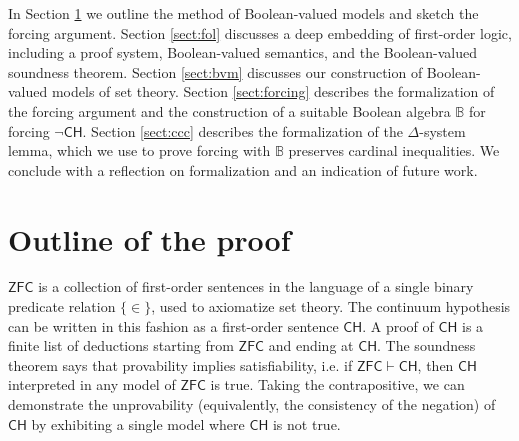 \documentclass[a4paper,USenglish,cleveref, autoref]{lipics-v2019}
\newcommand{\B}{\mathbb{B}}
\theoremstyle{definition}
\begin{document}
In Section \ref{sect:outline} we outline the method of Boolean-valued models and sketch the forcing argument. Section \ref{sect:fol} discusses a deep embedding of first-order logic, including a proof system, Boolean-valued semantics, and the Boolean-valued soundness theorem. Section \ref{sect:bvm} discusses our construction of Boolean-valued models of set theory. Section \ref{sect:forcing} describes the formalization of the forcing argument and the construction of a suitable Boolean algebra $\B$ for forcing $\neg\mathsf{CH}$. Section \ref{sect:ccc} describes the formalization of the $\Delta$-system lemma, which we use to prove forcing with $\B$ preserves cardinal inequalities. We conclude with a reflection on formalization and an indication of future work.
\section{Outline of the proof}
\label{sect:outline}


$\mathsf{ZFC}$ is a collection of first-order sentences in the language of a single binary predicate relation $\{\in\}$, used to axiomatize set theory. The continuum hypothesis can be written in this fashion as a first-order sentence $\mathsf{CH}$. A proof of $\mathsf{CH}$ is a finite list of deductions starting from $\mathsf{ZFC}$ and ending at $\mathsf{CH}$. %
The soundness theorem says that provability implies satisfiability, i.e. if $\mathsf{ZFC} \vdash \mathsf{CH}$, then $\mathsf{CH}$ interpreted in any model of $\mathsf{ZFC}$ is true. Taking the contrapositive, we can demonstrate the unprovability (equivalently, the consistency of the negation) of $\mathsf{CH}$ by exhibiting a single model where $\mathsf{CH}$ is not true.
\end{document}

